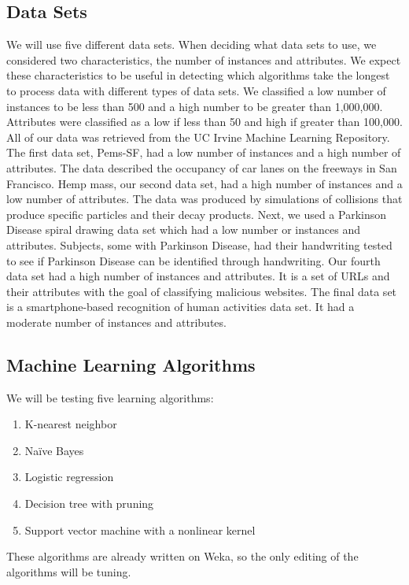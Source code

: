 \documentclass[11pt]{article} %
\begin{document}
\subsection{Data Sets}
We will use five different data sets.  When deciding what data sets to use, we considered two characteristics, the number of instances and attributes.  We expect these characteristics to be useful in detecting which algorithms take the longest to process data with different types of data sets.  We classified a low number of instances to be less than 500 and a high number to be greater than 1,000,000.  Attributes were classified as a low if less than 50 and high if greater than 100,000.  All of our data was retrieved from the UC Irvine Machine Learning Repository.  The first data set, Pems-SF, had a low number of instances and a high number of attributes.  The data described the occupancy of car lanes on the freeways in San Francisco.  Hemp mass, our second data set, had a high number of instances and a low number of attributes.  The data was produced by simulations of collisions that produce specific particles and their decay products. Next, we used a Parkinson Disease spiral drawing data set which had a low number or instances and attributes.  Subjects, some with Parkinson Disease, had their handwriting tested to see if Parkinson Disease can be identified through handwriting.  Our fourth data set had a high number of instances and attributes.  It is a set of URLs and their attributes with the goal of classifying malicious websites.  The final data set is a smartphone-based recognition of human activities data set.  It had a moderate number of instances and attributes.

\subsection{Machine Learning Algorithms}
We will be testing five learning algorithms:
\begin{enumerate}
	\item K-nearest neighbor
	\item Naïve Bayes
	\item Logistic regression
	\item Decision tree with pruning
	\item Support vector machine with a nonlinear kernel
\end{enumerate}
These algorithms are already written on Weka, so the only editing of the algorithms will be tuning.
\end{document}
